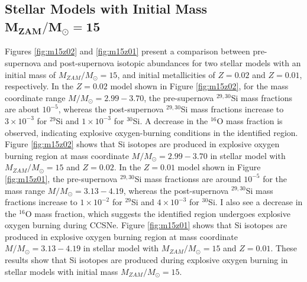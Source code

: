 \documentclass{brandeis-thesis3.2}
\def \msun {M_{\odot}}
\newcommand{\iso}[2]{$^{#1}${#2}}
\begin{document}

\subsection[Stellar Models with Initial Mass $M_{ZAM}/\msun = 15$]{Stellar Models with Initial Mass $\mathbf{M_{ZAM}/\msun = 15}$}
Figures \ref{fig:m15z02} and \ref{fig:m15z01} present a comparison between pre-supernova and post-supernova isotopic abundances for two stellar models with an initial mass of $M_{ZAM}/\msun =15$, and initial metallicities of $Z=0.02$ and $Z=0.01$, respectively. In the $Z=0.02$ model shown in Figure \ref{fig:m15z02}, for the mass coordinate range $M/\msun = 2.99 - 3.70$, the pre-supernova \iso{29, 30}{Si} mass fractions are about $10^{-5}$, whereas the post-supernova \iso{29, 30}{Si} mass fractions increase to $3\times 10^{-3}$ for \iso{29}{Si} and $1\times 10^{-3}$ for \iso{30}{Si}. A decrease in the \iso{16}{O} mass fraction is observed, indicating explosive oxygen-burning conditions in the identified region. Figure \ref{fig:m15z02} shows that Si isotopes are produced in explosive oxygen burning region at mass coordinate $M/\msun = 2.99-3.70$ in stellar model with $M_{ZAM}/\msun =15$ and $Z=0.02$. In the $Z=0.01$ model shown in Figure \ref{fig:m15z01}, the pre-supernova \iso{29, 30}{Si} mass fractionss are around $10^{-5}$ for the mass range $M/\msun = 3.13 - 4.19$, whereas the post-supernova \iso{29, 30}{Si} mass fractions increase to $1\times 10^{-2}$ for \iso{29}{Si} and $4\times 10^{-3}$ for \iso{30}{Si}. I also see a decrease in the \iso{16}{O} mass fraction, which suggests the identified region undergoes explosive oxygen burning during CCSNe. Figure \ref{fig:m15z01} shows that Si isotopes are produced in explosive oxygen burning region at mass coordinate $M/\msun = 3.13-4.19$ in stellar model with $M_{ZAM}/\msun =15$ and $Z=0.01$. These results show that Si isotopes are produced during explosive oxygen burning in stellar models with initial mass $M_{ZAM}/\msun =15$. 
\end{document}
